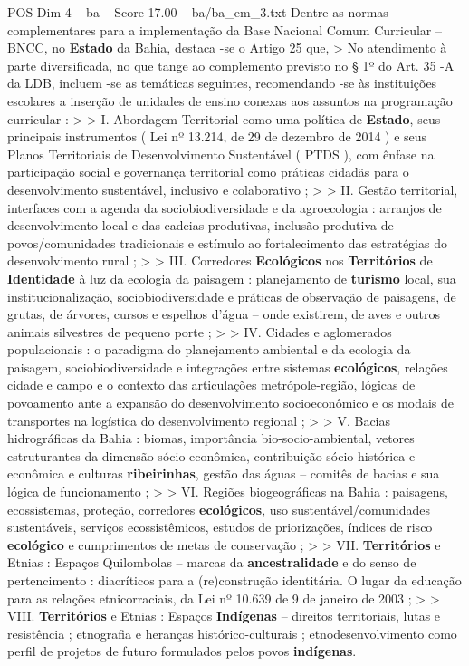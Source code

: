 \begin{textsample}{POS Dim 4 – ba – Score 17.00 – ba/ba\_em\_3.txt}
Dentre as normas complementares para a implementação da Base Nacional Comum Curricular – BNCC, no \textbf{Estado} da Bahia, destaca -se o Artigo 25 que, > No atendimento à parte diversificada, no que tange ao complemento previsto no § 1º do Art. 35 -A da LDB, incluem -se as temáticas seguintes, recomendando -se às instituições escolares a inserção de unidades de ensino conexas aos assuntos na programação curricular : > > I.
Abordagem Territorial como uma política de \textbf{Estado}, seus principais instrumentos ( Lei nº 13.214, de 29 de dezembro de 2014 ) e seus Planos Territoriais de Desenvolvimento Sustentável ( PTDS ), com ênfase na participação social e governança territorial como práticas cidadãs para o desenvolvimento sustentável, inclusivo e colaborativo ; > > II.
Gestão territorial, interfaces com a agenda da sociobiodiversidade e da agroecologia : arranjos de desenvolvimento local e das cadeias produtivas, inclusão produtiva de povos/comunidades tradicionais e estímulo ao fortalecimento das estratégias do desenvolvimento rural ; > > III.
Corredores \textbf{Ecológicos} nos \textbf{Territórios} de \textbf{Identidade} à luz da ecologia da paisagem : planejamento de \textbf{turismo} local, sua institucionalização, sociobiodiversidade e práticas de observação de paisagens, de grutas, de árvores, cursos e espelhos d’água – onde existirem, de aves e outros animais silvestres de pequeno porte ; > > IV.
Cidades e aglomerados populacionais : o paradigma do planejamento ambiental e da ecologia da paisagem, sociobiodiversidade e integrações entre sistemas \textbf{ecológicos}, relações cidade e campo e o contexto das articulações metrópole-região, lógicas de povoamento ante a expansão do desenvolvimento socioeconômico e os modais de transportes na logística do desenvolvimento regional ; > > V.
Bacias hidrográficas da Bahia : biomas, importância bio-socio-ambiental, vetores estruturantes da dimensão sócio-econômica, contribuição sócio-histórica e econômica e culturas \textbf{ribeirinhas}, gestão das águas – comitês de bacias e sua lógica de funcionamento ; > > VI.
Regiões biogeográficas na Bahia : paisagens, ecossistemas, proteção, corredores \textbf{ecológicos}, uso sustentável/comunidades sustentáveis, serviços ecossistêmicos, estudos de priorizações, índices de risco \textbf{ecológico} e cumprimentos de metas de conservação ; > > VII. \textbf{Territórios} e Etnias : Espaços Quilombolas – marcas da \textbf{ancestralidade} e do senso de pertencimento : diacríticos para a (re)construção identitária.
O lugar da educação para as relações etnicorraciais, da Lei nº 10.639 de 9 de janeiro de 2003 ; > > VIII. \textbf{Territórios} e Etnias : Espaços \textbf{Indígenas} – direitos territoriais, lutas e resistência ; etnografia e heranças histórico-culturais ; etnodesenvolvimento como perfil de projetos de futuro formulados pelos povos \textbf{indígenas}.

\end{textsample}
